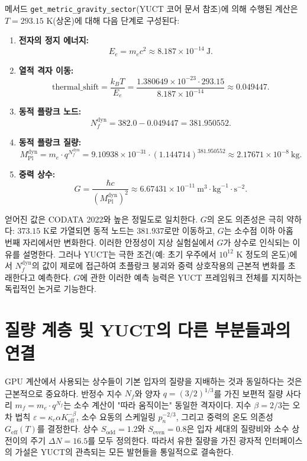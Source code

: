 \documentclass[11pt,a4paper]{article}
\begin{document}
	메서드 \texttt{get\_metric\_gravity\_sector}(YUCT 코어 문서 참조)에 의해 수행된 계산은 $T = 293.15$ K(상온)에 대해 다음 단계로 구성된다:
	
	\begin{enumerate}
		\item \textbf{전자의 정지 에너지:}
		\begin{equation}
			E_e = m_e c^2 \approx 8.187 \times 10^{-14}~\text{J}.
		\end{equation}
		\item \textbf{열적 격자 이동:}
		\begin{equation}
			\text{thermal\_shift} = \frac{k_B T}{E_e} = \frac{1.380649 \times 10^{-23} \cdot 293.15}{8.187 \times 10^{-14}} \approx 0.049447.
		\end{equation}
		\item \textbf{동적 플랑크 노드:}
		\begin{equation}
			N_f^{\text{dyn}} = 382.0 - 0.049447 = 381.950552.
		\end{equation}
		\item \textbf{동적 플랑크 질량:}
		\begin{equation}
			M_{\text{Pl}}^{\text{dyn}} = m_e \cdot q^{N_f^{\text{dyn}}} = 9.10938 \times 10^{-31} \cdot (1.144714)^{381.950552} \approx 2.17671 \times 10^{-8}~\text{kg}.
		\end{equation}
		\item \textbf{중력 상수:}
		\begin{equation}
			G = \frac{\hbar c}{(M_{\text{Pl}}^{\text{dyn}})^2} \approx 6.67431 \times 10^{-11}~\text{m}^3\!\cdot\!\text{kg}^{-1}\!\cdot\!\text{s}^{-2}.
		\end{equation}
	\end{enumerate}
	
	얻어진 값은 CODATA 2022와 높은 정밀도로 일치한다. $G$의 온도 의존성은 극히 약하다: $373.15$ K로 가열되면 동적 노드는 $381.937$로만 이동하고, $G$는 소수점 이하 아홉 번째 자리에서만 변화한다. 이러한 안정성이 지상 실험실에서 $G$가 상수로 인식되는 이유를 설명한다. 그러나 YUCT는 극한 조건(예: 초기 우주에서 $10^{12}$ K 정도의 온도)에서 $N_f^{\text{dyn}}$의 값이 제로에 접근하여 초플랑크 붕괴와 중력 상호작용의 근본적 변화를 초래한다고 예측한다. $G$에 관한 이러한 예측 능력은 YUCT 프레임워크 전체를 지지하는 독립적인 논거로 기능한다.
	
	\section{질량 계층 및 YUCT의 다른 부분들과의 연결}
	GPU 계산에서 사용되는 상수들이 기본 입자의 질량을 지배하는 것과 동일하다는 것은 근본적으로 중요하다. 반정수 지수 $N_f$와 양자 $q = (3/2)^{1/3}$를 가진 보편적 질량 사다리 $m_f = m_e \cdot q^{N_f}$는 소수 계산이 "따라 움직이는" 동일한 격자이다. 지수 $\beta = 2/3$는 오차 법칙 $\varepsilon = \kappa_c \alpha K_{\mathrm{eff}}^{-\beta}$, 소수 요동의 스케일링 $p_n^{-2/3}$, 그리고 중력의 온도 의존성 $G_{\mathrm{eff}}(T)$를 결정한다. 상수 $S_{\mathrm{odd}} = 1.2$와 $S_{\mathrm{even}} = 0.8$은 입자 세대의 질량비와 소수 상전이의 주기 $\Delta N = 16.5$를 모두 정의한다. 따라서 유한 질량을 가진 광자적 인터페이스의 가설은 YUCT의 관측되는 모든 발현들을 통일적으로 결속한다.
	
\end{document}
